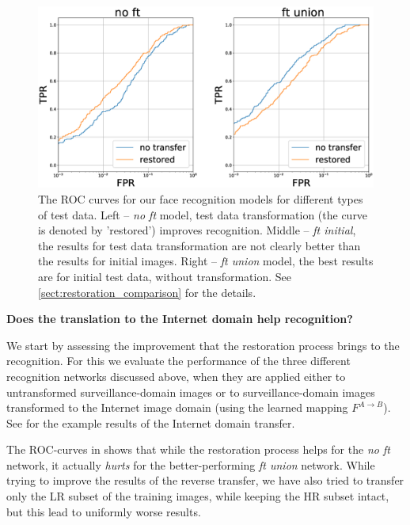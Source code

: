   
   \begin{figure}
  \centering
    \includegraphics[width=\linewidth]{Chapters/facev1/Fig4.eps}
    \caption{The ROC curves for our face recognition models for different types of test data. Left -- \textit{no ft} model, test data transformation (the curve is denoted by 'restored') improves recognition. Middle -- \textit{ft initial}, the results for test data transformation are not clearly better than the results for initial images. Right -- \textit{ft union} model, the best results are for initial test data, without transformation. See \ref{sect:restoration_comparison} for the details. }\label{fig:roc_oxford_gan_vs_initial}
  \end{figure}

\newpage
\bigskip\indent\textbf{Does the translation to the Internet domain help recognition?} 
\label{sect:restoration_comparison}

We start by assessing the improvement that the restoration process brings to the recognition. For this we evaluate the performance of the three different recognition networks discussed above, when they are applied either to untransformed surveillance-domain images or to surveillance-domain images transformed to the Internet image domain (using the learned mapping $F^{A \rightarrow B}$). See   for the example results of the Internet domain  transfer.

The ROC-curves in   shows that while the restoration process helps for the \textit{no ft} network, it actually \textit{hurts} for the better-performing \textit{ft union} network. While trying to improve the results of the reverse transfer, we have also tried to transfer only the LR subset of the training images, while keeping the HR subset intact, but this lead to uniformly worse results.

